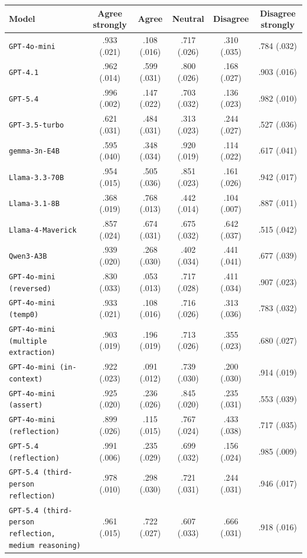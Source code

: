 \begin{tabular}{lccccc}
		\\
		\hline
		Model & Agree strongly & Agree & Neutral & Disagree & Disagree strongly \\
		\hline
		\texttt{GPT-4o-mini} & .933 (.021) & .108 (.016) & .717 (.026) & .310 (.035) & .784 (.032) \\
		\texttt{GPT-4.1} & .962 (.014) & .599 (.031) & .800 (.026) & .168 (.027) & .903 (.016) \\
		\texttt{GPT-5.4} & .996 (.002) & .147 (.022) & .703 (.032) & .136 (.023) & .982 (.010) \\
		\texttt{GPT-3.5-turbo} & .621 (.031) & .484 (.031) & .313 (.023) & .244 (.027) & .527 (.036) \\
		\texttt{gemma-3n-E4B} & .595 (.040) & .348 (.034) & .920 (.019) & .114 (.022) & .617 (.041) \\
		\texttt{Llama-3.3-70B} & .954 (.015) & .505 (.036) & .851 (.023) & .161 (.026) & .942 (.017) \\
		\texttt{Llama-3.1-8B} & .368 (.019) & .768 (.013) & .442 (.014) & .104 (.007) & .887 (.011) \\
		\texttt{Llama-4-Maverick} & .857 (.024) & .674 (.031) & .675 (.032) & .642 (.037) & .515 (.042) \\
		\texttt{Qwen3-A3B} & .939 (.020) & .268 (.030) & .402 (.034) & .441 (.041) & .677 (.039) \\
		\texttt{GPT-4o-mini (reversed)} & .830 (.033) & .053 (.013) & .717 (.028) & .411 (.034) & .907 (.023) \\
		\texttt{GPT-4o-mini (temp0)} & .933 (.021) & .108 (.016) & .716 (.026) & .313 (.036) & .783 (.032) \\
		\texttt{GPT-4o-mini (multiple extraction)} & .903 (.019) & .196 (.019) & .713 (.026) & .355 (.023) & .680 (.027) \\
		\texttt{GPT-4o-mini (in-context)} & .922 (.023) & .091 (.012) & .739 (.030) & .200 (.030) & .914 (.019) \\
		\texttt{GPT-4o-mini (assert)} & .925 (.020) & .236 (.026) & .845 (.020) & .235 (.031) & .553 (.039) \\
		\texttt{GPT-4o-mini (reflection)} & .899 (.026) & .115 (.015) & .767 (.024) & .433 (.038) & .717 (.035) \\
		\texttt{GPT-5.4 (reflection)} & .991 (.006) & .235 (.029) & .699 (.032) & .156 (.024) & .985 (.009) \\
		\texttt{GPT-5.4 (third-person reflection)} & .978 (.010) & .298 (.030) & .721 (.031) & .244 (.031) & .946 (.017) \\
		\texttt{GPT-5.4 (third-person reflection, medium reasoning)} & .961 (.015) & .722 (.027) & .607 (.033) & .666 (.031) & .918 (.016) \\
		\hline
\end{tabular}


